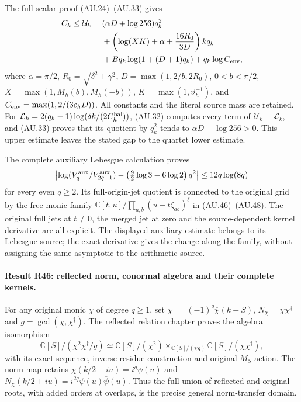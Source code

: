 The full scalar proof (AU.24)--(AU.33) gives
\begin{align*}
 C_k\le\mathcal U_k={}&(\alpha D+\log256)q_k^2\\
 &+\left(\log(XK)+\alpha+\frac{16R_0}{3D}\right)kq_k\\
 &+Bq_k\log(1+(D+1)q_k)+q_k\log C_{\rm env},
\end{align*}
where $\alpha=\pi/2$, $R_0=\sqrt{\delta^2+\gamma^2}$,
$D=\max(1,2/b,2R_0)$, $0<b<\pi/2$,
$X=\max(1,M_h(b),M_h(-b))$, $K=\max(1,\vartheta_h^{-1})$,
and $C_{\rm env}=\max(1,2/(3c_hD))$.
All constants and the literal source mass are retained. For
$\mathcal L_k=2(q_k-1)\log(\delta k/(2C_h^{\rm bal}))$,
(AU.32) computes every term of $\mathcal U_k-\mathcal L_k$,
and (AU.33) proves that its quotient by $q_k^2$ tends to
$\alpha D+\log256>0$. This upper estimate leaves the stated
gap to the quartet lower estimate.

The complete auxiliary Lebesgue calculation proves
\[
 \left|\log(V_q^{\rm aux}/V_{2q-1}^{\rm aux})
       -\left(\tfrac92\log3-6\log2\right)q^2\right|
 \le12q\log(8q)
\]
for every even $q\ge2$. Its full-origin-jet quotient is connected
to the original grid by the free monic family
$\mathbb C[t,u]/\prod_{a,b}(u-t\zeta_{ab})^\ell$ in
(AU.46)--(AU.48). The original full jets at $t\ne0$, the merged
jet at zero and the source-dependent kernel derivative are all
explicit. The displayed auxiliary estimate belongs to its
Lebesgue source; the exact derivative gives the change along the
family, without assigning the same asymptotic to the arithmetic source.

\paragraph{Result R46: reflected norm, conormal algebra and their complete kernels.}
For any original monic $\chi$ of degree $q\ge1$, set
$\chi^\dagger=(-1)^q\overline\chi(k-S)$,
$N_\chi=\chi\chi^\dagger$ and $g=\gcd(\chi,\chi^\dagger)$.
The reflected relation chapter proves the algebra isomorphism
\[
 \mathbb C[S]/(\chi^2\chi^\dagger/g)
 \simeq
 \mathbb C[S]/(\chi^2)
 \mathbin{\times}_{\mathbb C[S]/(\chi g)}
 \mathbb C[S]/(\chi\chi^\dagger),
\]
with its exact sequence, inverse residue construction and original
$M_S$ action. The norm map retains
$\chi(k/2+iu)=i^q\psi(u)$ and
$N_\chi(k/2+iu)=i^{2q}\psi(u)\overline\psi(u)$.
Thus the full union of reflected and original roots, with added
orders at overlaps, is the precise general norm-transfer domain.

